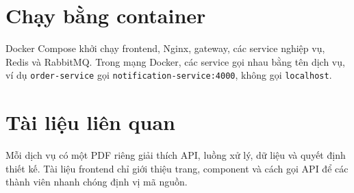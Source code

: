 \documentclass[12pt]{article}
\begin{document}
\section{Chạy bằng container}
Docker Compose khởi chạy frontend, Nginx, gateway, các service nghiệp vụ, Redis và RabbitMQ. Trong mạng Docker, các service gọi nhau bằng tên dịch vụ, ví dụ \texttt{order-service} gọi \texttt{notification-service:4000}, không gọi \texttt{localhost}.


\section{Tài liệu liên quan}
Mỗi dịch vụ có một PDF riêng giải thích API, luồng xử lý, dữ liệu và quyết định thiết kế. Tài liệu frontend chỉ giới thiệu trang, component và cách gọi API để các thành viên nhanh chóng định vị mã nguồn.
\end{document}
